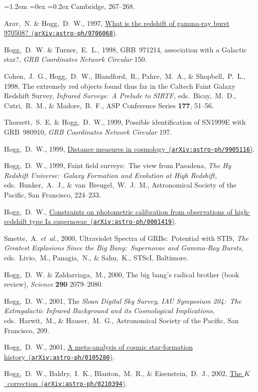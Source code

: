 \documentclass[10pt,letterpaper]{article}
\newcommand{\acronym}[1]{{\small{#1}}}
\newcommand{\foreign}[1]{\textsl{#1}}
\newcommand{\etal}{\foreign{et~al.}}
\newcommand{\project}[1]{\textsl{#1}}
\newcommand{\arxiv}[2]{\href{http://arxiv.org/abs/#1}{{#2}\ (\texttt{arXiv:#1})}}
\newcounter{refpubnum}
\newcommand{\hogglist}{%
    \rightmargin=0in
    \leftmargin=1.2em
    \topsep=0ex
    \partopsep=0pt
    \itemsep=0.2ex
    \parsep=0pt
    \itemindent=-1.0\leftmargin
    \listparindent=0.0\leftmargin
    \settowidth{\labelsep}{~}
    \usecounter{refpubnum}
  }
\begin{document}
\begin{list}{}{\hogglist}
Cambridge, 267--268.
\item
Arav,~N. \& Hogg,~D.~W., 1997,
\arxiv{astro-ph/9706068}{What is the redshift of gamma-ray burst 970508?}.
\item
Hogg,~D.~W. \& Turner,~E.~L., 1998,
{\acronym{GRB}~971214, association with a Galactic star?},
\textit{\acronym{GRB} Coordinates Network Circular} 150.
\item
Cohen,~J.~G., Hogg,~D.~W., Blandford,~R., Pahre,~M.~A., \& Shopbell,~P.~L., 1998,
{The extremely red objects found thus far in the Caltech Faint Galaxy Redshift Survey},
\textit{Infrared Surveys:\ A Prelude to SIRTF,} eds.\ Bicay,~M.~D., Cutri,~R.~M., \& Madore,~B.~F.,
ASP Conference Series \textbf{177}, 51--56.
\item
Thorsett,~S.~E. \& Hogg,~D.~W., 1999,
{Possible identification of SN1999E with \acronym{GRB}~980910},
\textit{\acronym{GRB} Coordinates Network Circular} 197.
\item
Hogg,~D.~W., 1999,
\arxiv{astro-ph/9905116}{Distance measures in cosmology}.
\item
Hogg,~D.~W., 1999,
{Faint field surveys:\ The view from Pasadena},
\textit{The Hy Redshift Universe:\ Galaxy Formation and Evolution at
High Redshift,} eds.\ Bunker,~A.~J., \& van~Breugel,~W.~J.~M.,
Astronomical Society of the Pacific, San Francisco, 224--233.
\item
Hogg,~D.~W.,
\arxiv{astro-ph/0001419}{Constraints on photometric calibration from observations of high-redshift type Ia supernovae}.
\item
Smette,~A. \etal, 2000,
{Ultraviolet Spectra of \acronym{GRB}s:\ Potential with
\acronym{STIS}},
\textit{The Greatest Explosions Since the Big Bang:\ Supernovae
and Gamma-Ray Bursts,} eds.\ Livio,~M., Panagia,~N., \& Sahu,~K.,
STScI, Baltimore.
\item
Hogg,~D.~W. \& Zaldarriaga,~M., 2000,
{The big bang's radical brother
(book review)},
\textit{Science} \textbf{290} 2079--2080.
\item
Hogg,~D.~W., 2001,
{The \project{Sloan Digital Sky Survey}},
\textit{IAU Symposium 204:\ The Extragalactic Infrared Background and
its Cosmological Implications,} eds.\ Harwit,~M., \& Hauser,~M.~G.,
Astronomical Society of the Pacific, San Francisco, 209.
\item
Hogg,~D.~W., 2001,
\arxiv{astro-ph/0105280}{A meta-analysis of cosmic star-formation history}.
\item
Hogg,~D.~W., Baldry,~I.~K., Blanton,~M.~R., \& Eisenstein,~D.~J., 2002,
\arxiv{astro-ph/0210394}{The $K$~correction}.

\end{list}
\end{document}
